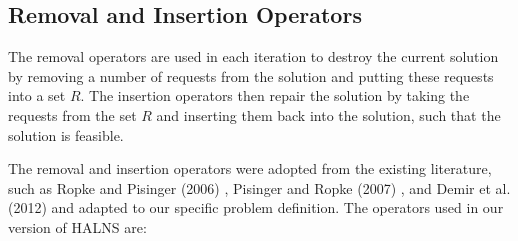     
    \subsection{Removal and Insertion Operators} \label{halns:insertion-removal}
    
    The removal operators are used in each iteration to destroy the current solution by removing a number of requests from the solution and putting these requests into a set $R$. The insertion operators then repair the solution by taking the requests from the set $R$ and inserting them back into the solution, such that the solution is feasible.
    
    The removal and insertion operators were adopted from the existing literature, such as Ropke and Pisinger (2006) \cite{Ropke2006}, Pisinger and Ropke (2007) \cite{Pisinger2007}, and Demir et al. (2012) \cite{Demir2012} and adapted to our specific problem definition. The operators used in our version of HALNS are:
    

